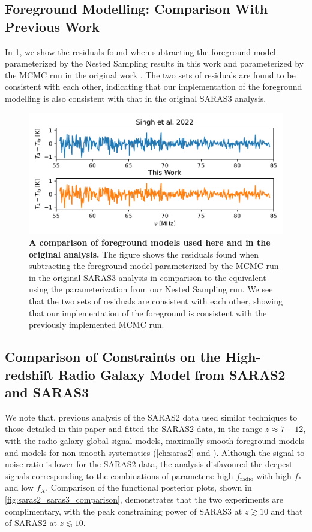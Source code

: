 \setcounter{figure}{0}
\setcounter{table}{0}

\subsection{Foreground Modelling: Comparison With Previous Work}

In \cref{fig:fore_comparison}, we show the residuals found when subtracting the foreground model parameterized by the Nested Sampling results in this work and parameterized by the MCMC run in the original work \cite{SARAS3}. The two sets of residuals are found to be consistent with each other, indicating that our implementation of the foreground modelling is also consistent with that in the original SARAS3 analysis.

\begin{figure}
    \centering
    \includegraphics{saras3/figs/FigureS1.pdf}
    \caption{\textbf{A comparison of foreground models used here and in the original analysis.} The figure shows the residuals found when subtracting the foreground model parameterized by the MCMC run in the original SARAS3 analysis in comparison to the equivalent using the parameterization from our Nested Sampling run. We see that the two sets of residuals are consistent with each other, showing that our implementation of the foreground is consistent with the previously implemented MCMC run.}
    \label{fig:fore_comparison}
\end{figure}

\subsection{Comparison of Constraints on the High-redshift Radio Galaxy Model from SARAS2 and SARAS3}
\label{sm:saras2}

We note that, previous analysis of the SARAS2 data used similar techniques to those detailed in this paper and fitted the SARAS2 data, in the range $z \approx 7 -12$, with the radio galaxy global signal models, maximally smooth foreground models and models for non-smooth systematics (\cref{ch:saras2} and \cite{Bevins_SARAS2_2022}). Although the signal-to-noise ratio is lower for the SARAS2 data, the analysis disfavoured the deepest signals corresponding to the  combinations of parameters: high $f_\mathrm{radio}$ with high $f_*$ and low $f_X$. Comparison of the functional posterior plots, shown in \cref{fig:saras2_saras3_comparison}, demonstrates that the two experiments are complimentary, with the peak constraining power of SARAS3 at $z \gtrsim 10$ and that of SARAS2 at  $z \lesssim 10$.


